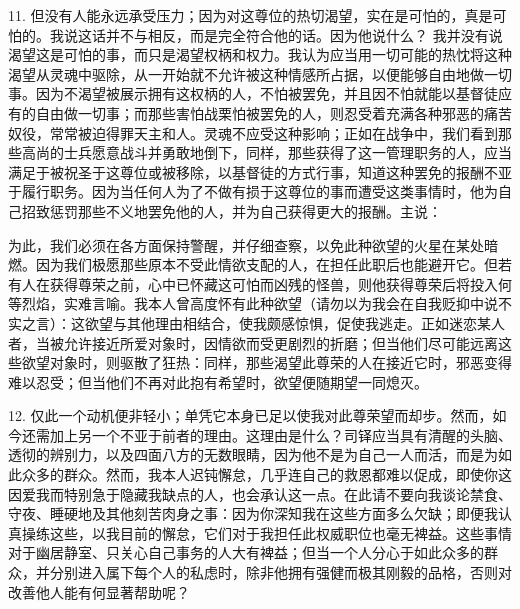 11. 但没有人能永远承受压力；因为对这尊位的热切渴望，实在是可怕的，真是可怕的。我说这话并不与相反，而是完全符合他的话。因为他说什么？ 我并没有说渴望这是可怕的事，而只是渴望权柄和权力。我认为应当用一切可能的热忱将这种渴望从灵魂中驱除，从一开始就不允许被这种情感所占据，以便能够自由地做一切事。因为不渴望被展示拥有这权柄的人，不怕被罢免，并且因不怕就能以基督徒应有的自由做一切事；而那些害怕战栗怕被罢免的人，则忍受着充满各种邪恶的痛苦奴役，常常被迫得罪天主和人。灵魂不应受这种影响；正如在战争中，我们看到那些高尚的士兵愿意战斗并勇敢地倒下，同样，那些获得了这一管理职务的人，应当满足于被祝圣于这尊位或被移除，以基督徒的方式行事，知道这种罢免的报酬不亚于履行职务。因为当任何人为了不做有损于这尊位的事而遭受这类事情时，他为自己招致惩罚那些不义地罢免他的人，并为自己获得更大的报酬。主说：\par

为此，我们必须在各方面保持警醒，并仔细查察，以免此种欲望的火星在某处暗燃。因为我们极愿那些原本不受此情欲支配的人，在担任此职后也能避开它。但若有人在获得尊荣之前，心中已怀藏这可怕而凶残的怪兽，则他获得尊荣后将投入何等烈焰，实难言喻。我本人曾高度怀有此种欲望（请勿以为我会在自我贬抑中说不实之言）：这欲望与其他理由相结合，使我颇感惊惧，促使我逃走。正如迷恋某人者，当被允许接近所爱对象时，因情欲而受更剧烈的折磨；但当他们尽可能远离这些欲望对象时，则驱散了狂热：同样，那些渴望此尊荣的人在接近它时，邪恶变得难以忍受；但当他们不再对此抱有希望时，欲望便随期望一同熄灭。\par

12. 仅此一个动机便非轻小；单凭它本身已足以使我对此尊荣望而却步。然而，如今还需加上另一个不亚于前者的理由。这理由是什么？司铎应当具有清醒的头脑、透彻的辨别力，以及四面八方的无数眼睛，因为他不是为自己一人而活，而是为如此众多的群众。然而，我本人迟钝懈怠，几乎连自己的救恩都难以促成，即使你这因爱我而特别急于隐藏我缺点的人，也会承认这一点。在此请不要向我谈论禁食、守夜、睡硬地及其他刻苦肉身之事：因为你深知我在这些方面多么欠缺；即便我认真操练这些，以我目前的懈怠，它们对于我担任此权威职位也毫无裨益。这些事情对于幽居静室、只关心自己事务的人大有裨益；但当一个人分心于如此众多的群众，并分别进入属下每个人的私虑时，除非他拥有强健而极其刚毅的品格，否则对改善他人能有何显著帮助呢？\par

